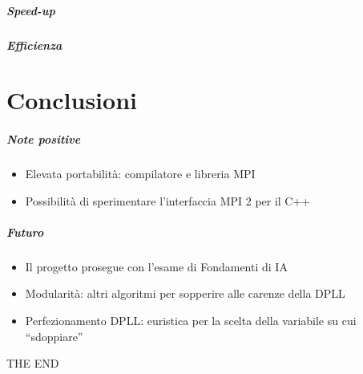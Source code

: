 \documentclass[12pt,xcolor=dvipsnames]{beamer}
\begin{document}
\begin{frame}
	\frametitle{Speed-up}
    \begin{center}
    \end{center}
\end{frame}

\begin{frame}
	\frametitle{Efficienza}
    \begin{center}
    \end{center}
\end{frame}

\part{Conclusioni}

\begin{frame}
	\partpage
\end{frame}

\begin{frame}
	\frametitle{Note positive}
	\begin{itemize}
     \item Elevata portabilità: compilatore e libreria MPI \pause
     \item Possibilità di sperimentare l'interfaccia MPI 2 per il C++
	\end{itemize}
\end{frame}

\begin{frame}
	\frametitle{Futuro}
	\begin{itemize}
	 \item Il progetto prosegue con l'esame di Fondamenti di IA \pause
	 \item Modularità: altri algoritmi per sopperire alle carenze della DPLL \pause
	 \item Perfezionamento DPLL: euristica per la scelta della variabile su cui ``sdoppiare''
	\end{itemize}
\end{frame}

\begin{frame}
    \begin{center}
        \Huge{THE END}
    \end{center}
\end{frame}
\end{document}
